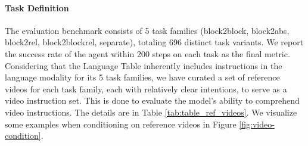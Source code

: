 \paragraph{Task Definition} The evaluation benchmark consists of 5 task families (block2block, block2abs, block2rel, block2blockrel, separate), totaling 696 distinct task variants. We report the success rate of the agent within 200 steps on each task as the final metric. Considering that the Language Table inherently includes instructions in the language modality for its 5 task families, we have curated a set of reference videos for each task family, each with relatively clear intentions, to serve as a video instruction set. This is done to evaluate the model's ability to comprehend video instructions. 
The details are in Table \ref{tab:table_ref_videos}. 
We visualize some examples when conditioning \agent on reference videos in Figure \ref{fig:video-condition}. 

